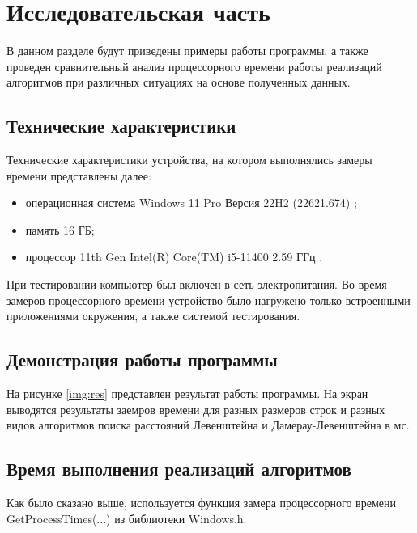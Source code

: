 \chapter{Исследовательская часть}

В данном разделе будут приведены примеры работы программы, а также проведен сравнительный анализ процессорного времени работы реализаций алгоритмов при различных ситуациях на основе полученных данных.

\section{Технические характеристики}

Технические характеристики устройства, на котором выполнялись замеры времени представлены далее:

\begin{itemize}
	\item операционная система Windows 11 Pro Версия 22H2 (22621.674) \cite{wind};
	\item память 16 ГБ;
	\item процессор 11th Gen Intel(R) Core(TM) i5-11400 2.59 ГГц \cite{proc}.
\end{itemize}

При тестировании компьютер был включен в сеть электропитания. Во время замеров процессорного времени устройство было нагружено только встроенными приложениями окружения, а также системой тестирования.

\section{Демонстрация работы программы}

На рисунке \ref{img:res} представлен результат работы программы. На экран выводятся результаты заемров времени для разных размеров строк и разных видов алгоритмов поиска расстояний Левенштейна и Дамерау-Левенштейна в мс.
\newpage
%
\begin{center}
	\label{img:res}
\end{center}

\section{Время выполнения реализаций алгоритмов}

Как было сказано выше, используется функция замера процессорного времени GetProcessTimes(...) из библиотеки Windows.h. 

